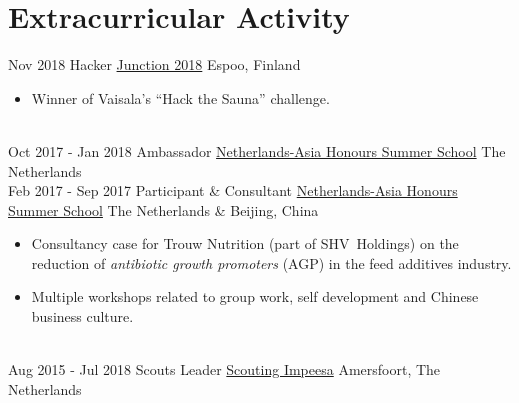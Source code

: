 \documentclass[a4paper]{twentysecondcv} %
\begin{document}

\section{Extracurricular Activity}
\begin{twenty} %
	\twentyitem
	{Nov 2018}
	{}
	{Hacker}
	{\href{https://hackjunction.com/}{Junction 2018}}
	{Espoo, Finland}
	{
	\begin{itemize}
			\item Winner of Vaisala's ``Hack the Sauna'' challenge.
	\end{itemize}
	}
	\\
	\twentyitem
	{Oct 2017 -}
	{Jan 2018}
	{Ambassador}
	{\href{https://nahss.nl/en}{Netherlands-Asia Honours Summer School}}
	{The Netherlands}
	{}
	\\
	\twentyitem
	{Feb 2017 -}
	{Sep 2017}
	{Participant \& Consultant}
	{\href{https://nahss.nl/en}{Netherlands-Asia Honours Summer School}}
	{The Netherlands \& Beijing, China}
	{
		\begin{itemize}
			\item Consultancy case for Trouw Nutrition (part of SHV~Holdings) on the reduction of \emph{antibiotic growth promoters} (AGP) in the feed additives industry.
			\item Multiple workshops related to group work, self development and Chinese business culture.
		\end{itemize}
	}
	\\
	\twentyitem
	{Aug 2015 -}
	{Jul 2018}
	{Scouts Leader}
	{\href{http://impeesa.nl/}{Scouting Impeesa}}
	{Amersfoort, The Netherlands}
	{}
	\\
\end{twenty}
\end{document}
